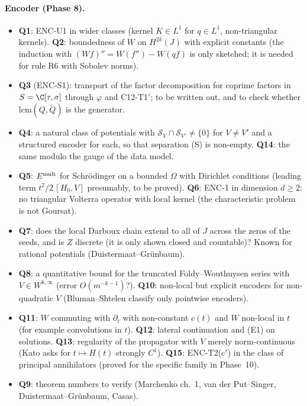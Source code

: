 \paragraph{Encoder (Phase 8).}
\begin{itemize}
\item \textbf{Q1}: ENC-U1 in wider classes (kernel $K\in L^1$ for $q\in L^1$, non-triangular kernels). \textbf{Q2}: boundedness of $W$ on $H^{2k}(J)$ with explicit constants (the induction with $(Wf)''=W(f'')-W(qf)$ is only sketched; it is needed for rule R6 with Sobolev norms).
\item \textbf{Q3} (ENC-S1): transport of the factor decomposition for coprime factors in $S=\C[\tau,\sigma]$ through $\varphi$ and C12-T1$'$; to be written out, and to check whether $\mathrm{lcm}(Q,\tilde Q)$ is the generator.
\item \textbf{Q4}: a natural class of potentials with $\mathcal S_V\cap\mathcal S_{V'}\ne\{0\}$ for $V\ne V'$ and a structured encoder for each, so that separation (S) is non-empty. \textbf{Q14}: the same modulo the gauge of the data model.
\item \textbf{Q5}: $E^{\rm mult}$ for Schr\"odinger on a bounded $\Omega$ with Dirichlet conditions (leading term $t^2/2\,[H_0,V]$ presumably, to be proved). \textbf{Q6}: ENC-1 in dimension $d\ge2$: no triangular Volterra operator with local kernel (the characteristic problem is not Goursat).
\item \textbf{Q7}: does the local Darboux chain extend to all of $J$ across the zeros of the seeds, and is $Z$ discrete (it is only shown closed and countable)? Known for rational potentials (Duistermaat--Gr\"unbaum).
\item \textbf{Q8}: a quantitative bound for the truncated Foldy--Wouthuysen series with $V\in W^{k,\infty}$ (error $O(m^{-k-1})$?). \textbf{Q10}: non-local but explicit encoders for non-quadratic $V$ (Bluman--Shtelen classify only pointwise encoders).
\item \textbf{Q11}: $W$ commuting with $\partial_t$ with non-constant $c(t)$ and $W$ non-local in $t$ (for example convolutions in $t$). \textbf{Q12}: lateral continuation and (E1) on solutions. \textbf{Q13}: regularity of the propagator with $V$ merely norm-continuous (Kato asks for $t\mapsto H(t)$ strongly $C^1$). \textbf{Q15}: ENC-T2(c$'$) in the class of principal annihilators (proved for the specific family in Phase~10).
\item \textbf{Q9}: theorem numbers to verify (Marchenko ch.~1, van der Put--Singer, Duistermaat--Gr\"unbaum, Casas).
\end{itemize}

